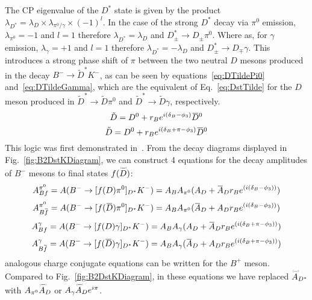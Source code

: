 \documentclass[oneside,12pt]{article}
\newcommand{\overbar}[1]{\mkern 1.5mu\overline{\mkern-1.5mu#1\mkern-1.5mu}\mkern
1.5mu}
\newcommand\brobor{\smash[b]{\raisebox{0.6\height}{\scalebox{0.5}{\tiny(}}{\mkern-1.5mu\scriptstyle-\mkern-1.5mu}\raisebox{0.6\height}{\scalebox{0.5}{\tiny)}}}}
\begin{document}
The CP eigenvalue of the $D^*$ state is given by the product
$\lambda_{D^*}=\lambda_D\times \lambda_{\pi^0\text{/}\gamma} \times(-1)^l$. In
the case of the strong $D^*$ decay via $\pi^0$ emission, $\lambda_{\pi^0}=-1$
and $l=1$ therefore $\lambda_{D^*}=\lambda_D$ and $D^*_{\pm}\rightarrow
D_{\pm}\pi^0$. Where as, for $\gamma$ emission, $\lambda_{\gamma}=+1$ and $l=1$
therefore $\lambda_{D^*}=-\lambda_D$ and $D^*_{\pm}\rightarrow D_{\mp}\gamma$.
This introduces a strong phase shift of $\pi$ between the two neutral $D$ mesons
produced in the decay $B^-\rightarrow \tilde{D}^*K^-$, as can be seen by
equations~\eqref{eq:DTildePi0} and~\eqref{eq:DTildeGamma}, which are the
equivalent of Eq.~\eqref{eq:DstTilde} for the $D$ meson produced in
$\tilde{D}^*\rightarrow \tilde{D}\pi^0$ and $\tilde{D}^*\rightarrow
\tilde{D}\gamma$, respectively.
  \begin{equation}
    \tilde{D}=D^0+r_Be^{i(\delta_B-\phi_3)}\overbar{D}^0
    \label{eq:DTildePi0}
  \end{equation}
  \begin{equation}
    \tilde{D}=D^0+r_Be^{i(\delta_B+\pi-\phi_3)}\overbar{D}^0
    \label{eq:DTildeGamma}
  \end{equation}
\noindent This logic was first demonstrated in~\cite{ADSDstar}. From the decay
diagrams displayed in Fig.~\ref{fig:B2DstKDiagram}, we can construct 4 equations
for the decay amplitudes of $B^{-}$ mesons to final states
$f(\accentset{\brobor}{D}\phantom{})$:
  \begin{equation}
    A_{Bf}^{\pi^{0}}=A(B^{-}\rightarrow
    [f(D)\pi^{0}]_{D^{*}}K^{-})=A_{B}A_{\pi^{0}}(A_{D}+\overbar{A}_{D}r_{B}e^{(i(\delta_{B}-\phi_{3}))})
    \label{eq:A(Bf)pi0}
  \end{equation}
  \begin{equation}
    A_{B\overbar{f}}^{\pi^{0}}=A(B^{-}\rightarrow
    [f(\overbar{D})\pi^{0}]_{D^{*}}K^{-})=A_{B}A_{\pi^{0}}(\overbar{A}_{D}+A_{D}r_{B}e^{(i(\delta_{B}-\phi_{3}))})
    \label{eq:A(Bfbar)pi0}
  \end{equation}
  \begin{equation}
    A_{Bf}^{\gamma}=A(B^{-}\rightarrow
    [f(D)\gamma]_{D^{*}}K^{-})=A_{B}A_{\gamma}(A_{D}+\overbar{A}_{D}r_{B}e^{(i(\delta_{B}+\pi-\phi_{3}))})
    \label{eq:A(Bf)gamma}
  \end{equation}
  \begin{equation}
    A_{B\overbar{f}}^{\gamma}=A(B^{-}\rightarrow
    [f(\overbar{D})\gamma]_{D^{*}}K^{-})=A_{B}A_{\gamma}(\overbar{A}_{D}+A_{D}r_{B}e^{(i(\delta_{B}+\pi-\phi_{3}))})
    \label{eq:A(Bfbar)gamma}
  \end{equation}
 analogous charge conjugate equations can be written for the $B^{+}$
meson. Compared to Fig.~\ref{fig:B2DstKDiagram}, in these equations we have
replaced $\accentset{\brobor}{A}\phantom{}_{D^{*}}$ with
$A_{\pi^{0}}\accentset{\brobor}{A}\phantom{}_{D}$ or
$A_{\gamma}\accentset{\brobor}{A}\phantom{}_{D}e^{{i\pi}}$. 
\end{document}

